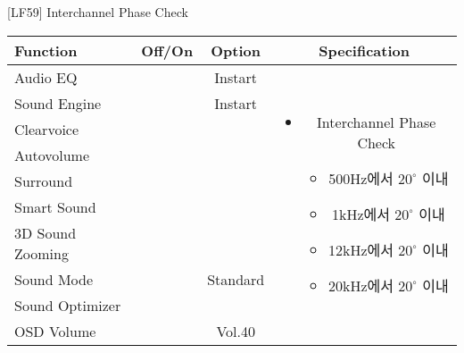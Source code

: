 \begin{frame}[t]{[LF59] Interchannel Phase Check}
\begin{tiny}
\begin{tabular}{@{}lccc@{}}
\toprule
Function & Off/On & Option & Specification \\
\midrule
Audio EQ & \color{black}{Off} & Instart &
\multirow{10}{60mm}{
\begin{itemize}
\item Interchannel Phase Check
	\begin{itemize}
	\item 500Hz에서 \(20^\circ\) 이내
	\item 1kHz에서 \(20^\circ\) 이내
	\item 12kHz에서 \(20^\circ\) 이내
	\item 20kHz에서 \(20^\circ\) 이내
	\end{itemize}
\end{itemize}
} \\
Sound Engine & \color{black}{Off} & Instart & \\
Clearvoice & \color{black}{Off} & & \\
Autovolume & \color{black}{Off} & & \\
Surround & \color{black}{Off} & & \\
Smart Sound & \color{black}{Off} & & \\
3D Sound Zooming & \color{black}{Off} & & \\
Sound Mode & \color{blue}{On} & Standard & \\
Sound Optimizer & \color{black}{Off} & & \\
OSD Volume & \color{blue}{On} & Vol.40 & \\
\midrule
\end{tabular}
\end{tiny}

\end{frame}
